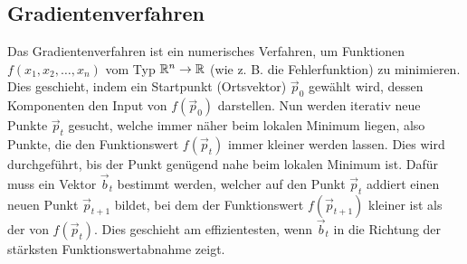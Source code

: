 
\begin{appendices}

\chapter{Gradientenverfahren}\label{sec:anhang_gd}
Das Gradientenverfahren ist ein numerisches Verfahren, um Funktionen $f(x_1,
x_2, \ldots, x_n)$ vom Typ $\mathbb{R}^n \to \mathbb{R}$ (wie z. B. die Fehlerfunktion)
zu minimieren.
Dies geschieht, indem ein Startpunkt (Ortsvektor) $\vec{p}_0$ gewählt wird, dessen
Komponenten den Input von $f(\vec{p}_0)$ darstellen.
Nun werden iterativ neue Punkte $\vec{p}_t$ gesucht, welche immer näher beim lokalen Minimum liegen, also Punkte, die den Funktionswert $f(\vec{p}_t)$ immer kleiner werden lassen.
Dies wird durchgeführt, bis der Punkt genügend nahe beim lokalen Minimum ist.
\para{}
Dafür muss ein Vektor $\vec{b}_t$ bestimmt werden, welcher auf den Punkt $\vec{p}_t$ addiert einen neuen Punkt $\vec{p}_{t+1}$ bildet,
bei dem der Funktionswert $f(\vec{p}_{t+1})$ kleiner ist als der von $f(\vec{p}_t)$.
Dies geschieht am effizientesten, wenn $\vec{b}_t$ in die Richtung der stärksten Funktionswertabnahme zeigt.


\end{appendices}
